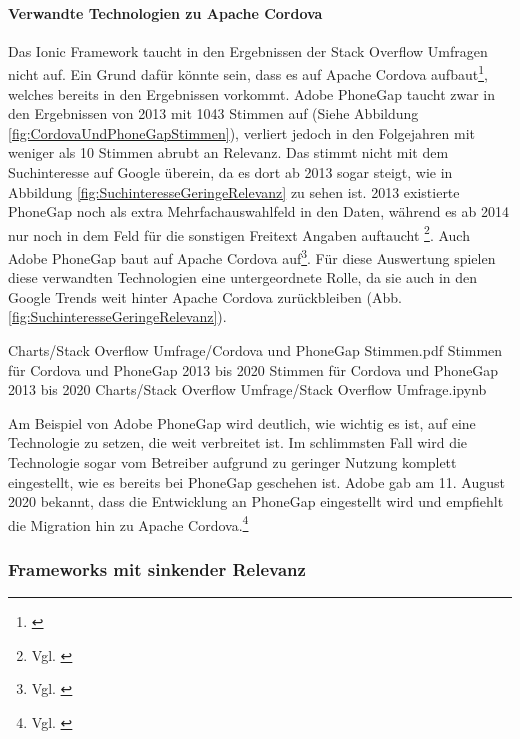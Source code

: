 \paragraph{Verwandte Technologien zu Apache Cordova} Das Ionic Framework taucht in den Ergebnissen der Stack Overflow Umfragen nicht auf.
Ein Grund dafür könnte sein, dass es auf Apache Cordova aufbaut\footnote{\cite{TheLastWordOnCordovaAndPhoneGap}}, welches bereits in den Ergebnissen vorkommt.
Adobe PhoneGap taucht zwar in den Ergebnissen von 2013 mit 1043 Stimmen auf (Siehe Abbildung \ref{fig:CordovaUndPhoneGapStimmen}), verliert jedoch in den Folgejahren mit weniger als 10 Stimmen abrubt an Relevanz.
 Das stimmt nicht mit dem Suchinteresse auf Google überein, da es dort ab 2013 sogar steigt, wie in Abbildung \ref{fig:SuchinteresseGeringeRelevanz} zu sehen ist. 2013 existierte PhoneGap noch als extra Mehrfachauswahlfeld in den Daten, während es ab 2014 nur noch in dem Feld für die sonstigen Freitext Angaben auftaucht \footnote{Vgl. \cite{StackOverflowInsights}}.
Auch Adobe PhoneGap baut auf Apache Cordova auf\footnote{Vgl.
\cite{FaqPhoneGapDocs}}.
Für diese Auswertung spielen diese verwandten Technologien eine untergeordnete Rolle, da sie auch in den Google Trends weit hinter Apache Cordova zurückbleiben (Abb.
\ref{fig:SuchinteresseGeringeRelevanz}).

\begin{alexfigurewithnotebook}{Charts/Stack Overflow Umfrage/Cordova und PhoneGap Stimmen.pdf}
	{Stimmen für Cordova und PhoneGap 2013 bis 2020}
	{Stimmen für Cordova und PhoneGap 2013 bis 2020}
	{Charts/Stack Overflow Umfrage/Stack Overflow Umfrage.ipynb}
	{}
	\label{fig:CordovaUndPhoneGapStimmen}

\end{alexfigurewithnotebook}

Am Beispiel von Adobe PhoneGap wird deutlich, wie wichtig es ist, auf eine Technologie zu setzen, die weit verbreitet ist.
Im schlimmsten Fall wird die Technologie sogar vom Betreiber aufgrund zu geringer Nutzung komplett eingestellt, wie es bereits bei PhoneGap geschehen ist.
Adobe gab am 11.
August 2020 bekannt, dass die  Entwicklung an PhoneGap eingestellt wird und empfiehlt die Migration hin zu Apache Cordova.\footnote{Vgl. \cite{UpdateForCustomersUsingPhoneGapAndPhoneGapBuild}}

\subsubsection{Frameworks mit sinkender Relevanz}

